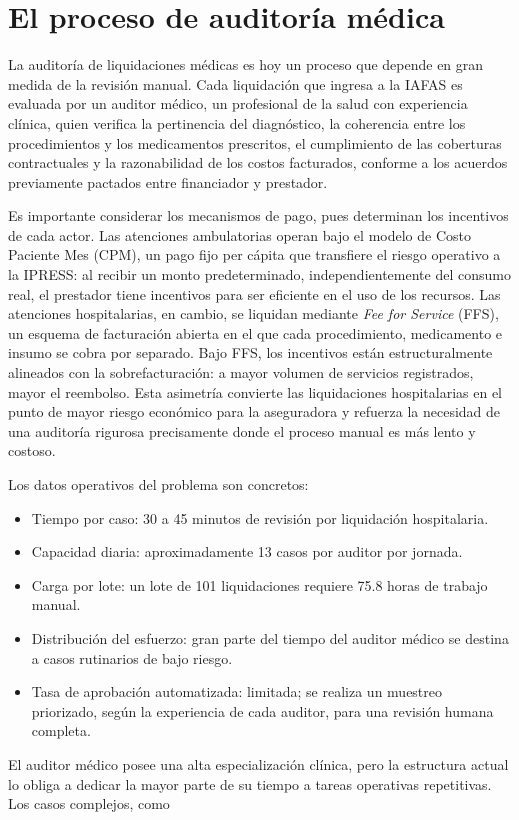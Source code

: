 \section{El proceso de auditoría médica}

La auditoría de liquidaciones médicas es hoy un proceso que depende en gran medida de la revisión manual. Cada liquidación que ingresa a la IAFAS es evaluada por un auditor médico, un profesional de la salud con experiencia clínica, quien verifica la pertinencia del diagnóstico, la coherencia entre los procedimientos y los medicamentos prescritos, el cumplimiento de las coberturas contractuales y la razonabilidad de los costos facturados, conforme a los acuerdos previamente pactados entre financiador y prestador.

Es importante considerar los mecanismos de pago, pues determinan los incentivos de cada actor. Las atenciones ambulatorias operan bajo el modelo de Costo Paciente Mes (CPM), un pago fijo per cápita que transfiere el riesgo operativo a la IPRESS: al recibir un monto predeterminado, independientemente del consumo real, el prestador tiene incentivos para ser eficiente en el uso de los recursos. Las atenciones hospitalarias, en cambio, se liquidan mediante \textit{Fee for Service} (FFS), un esquema de facturación abierta en el que cada procedimiento, medicamento e insumo se cobra por separado. Bajo FFS, los incentivos están estructuralmente alineados con la sobrefacturación: a mayor volumen de servicios registrados, mayor el reembolso. Esta asimetría convierte las liquidaciones hospitalarias en el punto de mayor riesgo económico para la aseguradora y refuerza la necesidad de una auditoría rigurosa precisamente donde el proceso manual es más lento y costoso.

Los datos operativos del problema son concretos:

\begin{itemize}
    \item Tiempo por caso: 30 a 45 minutos de revisión por liquidación hospitalaria.
    \item Capacidad diaria: aproximadamente 13 casos por auditor por jornada.
    \item Carga por lote: un lote de 101 liquidaciones requiere 75.8 horas de trabajo manual.
    \item Distribución del esfuerzo: gran parte del tiempo del auditor médico se destina a casos rutinarios de bajo riesgo.
    \item Tasa de aprobación automatizada: limitada; se realiza un muestreo priorizado, según la experiencia de cada auditor, para una revisión humana completa.
\end{itemize}
El auditor médico posee una alta especialización clínica, pero la estructura actual lo obliga a dedicar la mayor parte de su tiempo a tareas operativas repetitivas. Los casos complejos, como


